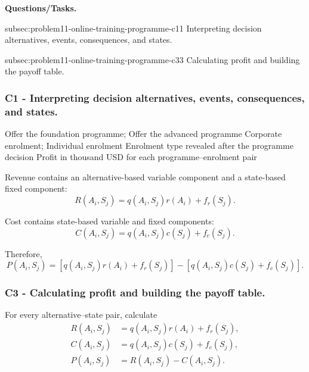 \textbf{Questions/Tasks.}
\begin{enumerate}
	\CriterionTask
	{subsec:problem11-online-training-programme-c1}{1}
	{Interpreting decision alternatives, events, consequences, and states.}

	\CriterionTask
	{subsec:problem11-online-training-programme-c3}{3}
	{Calculating profit and building the payoff table.}
\end{enumerate}

\subsubsection*{C1 - Interpreting decision alternatives, events, consequences, and states.}
\label{subsec:problem11-online-training-programme-c1}

\DecisionElementsTable
{Offer the foundation programme; Offer the advanced programme}
{Corporate enrolment; Individual enrolment}
{Enrolment type revealed after the programme decision}
{Profit in thousand USD for each programme--enrolment pair}

Revenue contains an alternative-based variable component and a state-based
fixed component:
\[
R(A_i,S_j)
=
q(A_i,S_j)r(A_i)+f_r(S_j).
\]

Cost contains state-based variable and fixed components:
\[
C(A_i,S_j)
=
q(A_i,S_j)c(S_j)+f_c(S_j).
\]

Therefore,
\[
P(A_i,S_j)
=
\left[
q(A_i,S_j)r(A_i)+f_r(S_j)
\right]
-
\left[
q(A_i,S_j)c(S_j)+f_c(S_j)
\right].
\]


\subsubsection*{C3 - Calculating profit and building the payoff table.}
\label{subsec:problem11-online-training-programme-c3}

For every alternative--state pair, calculate
\[
\begin{aligned}
	R(A_i,S_j)
	&=
	q(A_i,S_j)r(A_i)+f_r(S_j),
	\\
	C(A_i,S_j)
	&=
	q(A_i,S_j)c(S_j)+f_c(S_j),
	\\
	P(A_i,S_j)
	&=
	R(A_i,S_j)-C(A_i,S_j).
\end{aligned}
\]

